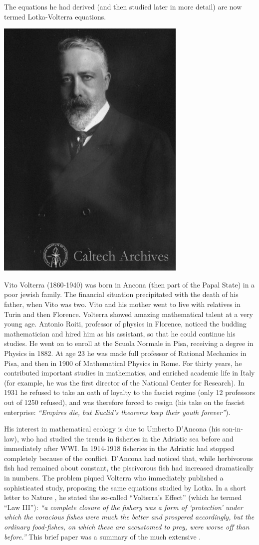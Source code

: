 \documentclass[
]{book}
\begin{document}
The equations he had derived (and then studied later in more detail) are now termed Lotka-Volterra equations.

\begin{center}\includegraphics[width=0.25\linewidth]{images/Volterra} \end{center}

Vito Volterra (1860-1940) was born in Ancona (then part of the Papal State) in a poor jewish family. The financial situation precipitated with the death of his father, when Vito was two. Vito and his mother went to live with relatives in Turin and then Florence. Volterra showed amazing mathematical talent at a very young age. Antonio Roiti, professor of physics in Florence, noticed the budding mathematician and hired him as his assistant, so that he could continue his studies. He went on to enroll at the Scuola Normale in Pisa, receiving a degree in Physics in 1882. At age 23 he was made full professor of Rational Mechanics in Pisa, and then in 1900 of Mathematical Physics in Rome. For thirty years, he contributed important studies in mathematics, and enriched academic life in Italy (for example, he was the first director of the National Center for Research). In 1931 he refused to take an oath of loyalty to the fascist regime (only 12 professors out of 1250 refused), and was therefore forced to resign (his take on the fascist enterprise: \emph{``Empires die, but Euclid's theorems keep their youth forever''}).

His interest in mathematical ecology is due to Umberto D'Ancona (his son-in-law), who had studied the trends in fisheries in the Adriatic sea before and immediately after WWI. In 1914-1918 fisheries in the Adriatic had stopped completely because of the conflict. D'Ancona had noticed that, while herbivorous fish had remained about constant, the piscivorous fish had increased dramatically in numbers. The problem piqued Volterra who immediately published a sophisticated study, proposing the same equations studied by Lotka. In a short letter to Nature \citep{volterra1926fluctuations}, he stated the so-called ``Volterra's Effect'' (which he termed ``Law III''): \emph{``a complete closure of the fishery was a form of `protection' under which the voracious fishes were much the better and prospered accordingly, but the ordinary food-fishes, on which these are accustomed to prey, were worse off than before.''} This brief paper was a summary of the much extensive \citet{volterra1926variazioni}.
\end{document}
